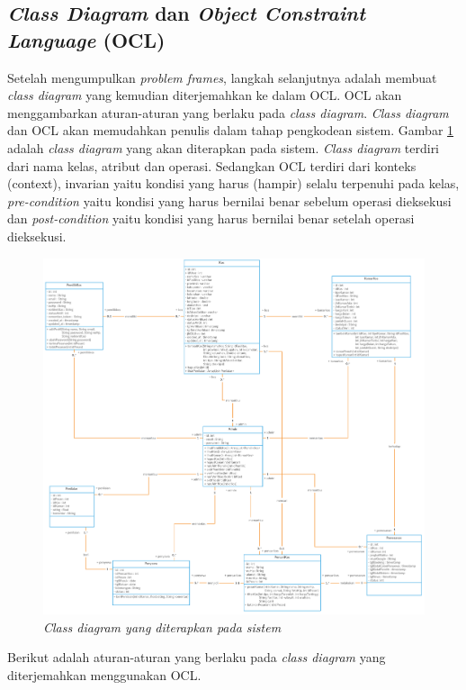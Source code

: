 	\subsection{\textit{Class Diagram} dan \textit{ Object Constraint Language} (OCL)}
	Setelah mengumpulkan \textit{problem frames}, langkah selanjutnya adalah membuat \textit{class diagram} yang kemudian diterjemahkan ke dalam OCL. OCL akan menggambarkan aturan-aturan yang berlaku pada \textit{class diagram}. \textit{Class diagram} dan OCL akan memudahkan penulis dalam tahap pengkodean sistem. Gambar \ref{cdiagram} adalah \textit{class diagram} yang akan diterapkan pada sistem. \textit{Class diagram} terdiri dari nama kelas, atribut dan operasi. Sedangkan OCL terdiri dari konteks (context), invarian yaitu kondisi yang harus (hampir) selalu terpenuhi pada kelas, \textit{pre-condition} yaitu kondisi yang harus bernilai benar sebelum operasi dieksekusi dan \textit{post-condition} yaitu kondisi yang harus bernilai benar setelah operasi dieksekusi.

	\begin{figure}[H]
		\centering
		\includegraphics[scale=0.3]{gambar/classD}
		\caption{\textit{Class diagram yang diterapkan pada sistem}}
		\label{cdiagram}
	\end{figure}

	Berikut adalah aturan-aturan yang berlaku pada \textit{class diagram} yang diterjemahkan menggunakan OCL.
	

